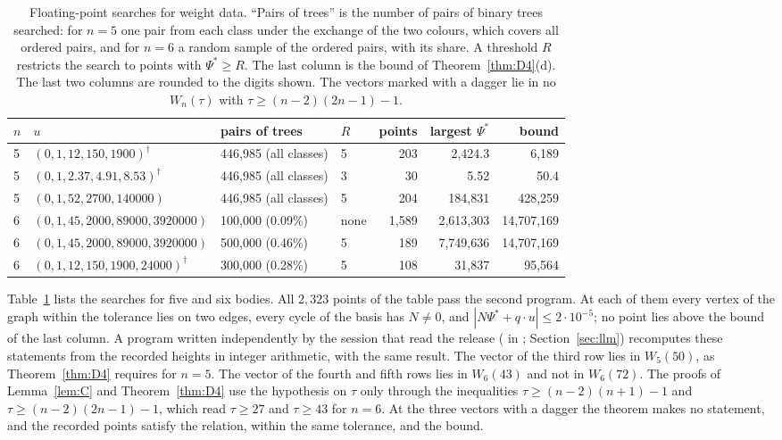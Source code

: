 \documentclass[11pt]{amsart}
\theoremstyle{definition}
\theoremstyle{remark}
\numberwithin{equation}{section}
\newcommand{\repo}[1]{\texttt{\detokenize{#1}}}
\newcommand{\Ps}{\Psi^{*}}
\begin{document}
\begin{table}[ht]
\caption{Floating-point searches for weight data. ``Pairs of trees'' is the number of pairs of binary
trees searched: for $n = 5$ one pair from each class under the exchange of the two colours, which
covers all ordered pairs, and for $n = 6$ a random sample of the ordered pairs, with its share. A
threshold $R$ restricts the search to points with $\Ps \ge R$. The last column is the bound of
Theorem~\ref{thm:D4}(d). The last two columns are rounded to the digits shown. The vectors marked
with a dagger lie in no $W_n(\tau)$ with $\tau \ge (n - 2)(2n - 1) - 1$.}\label{tab:comp}
\footnotesize
\setlength{\tabcolsep}{4pt}
\begin{tabular}{@{}l>{\raggedright}p{}>{\raggedright}p{}lrrr@{}}
\toprule
$n$ & $u$ & pairs of trees & $R$ & points & largest $\Ps$ & bound \\
\midrule
5 & $(0, 1, 12, 150, 1900)^{\dagger}$ & 446,985 (all classes) & 5 & 203 & 2,424.3 & 6,189 \\
5 & $(0, 1, 2.37, 4.91, 8.53)^{\dagger}$ & 446,985 (all classes) & 3 & 30 & 5.52 & 50.4 \\
5 & $(0, 1, 52, 2700, 140000)$ & 446,985 (all classes) & 5 & 204 & 184,831 & 428,259 \\
6 & $(0, 1, 45, 2000, 89000, 3920000)$ & 100,000 (0.09\%) & none & 1,589 & 2,613,303 & 14,707,169 \\
6 & $(0, 1, 45, 2000, 89000, 3920000)$ & 500,000 (0.46\%) & 5 & 189 & 7,749,636 & 14,707,169 \\
6 & $(0, 1, 12, 150, 1900, 24000)^{\dagger}$ & 300,000 (0.28\%) & 5 & 108 & 31,837 & 95,564 \\
\bottomrule
\end{tabular}
\end{table}

Table~\ref{tab:comp} lists the searches for five and six bodies. All $2{,}323$ points of the
table pass the second program. At each of them every vertex of the graph within the tolerance lies on
two edges, every cycle of the basis has $N \ne 0$, and $|N\Ps + q \cdot u| \le 2 \cdot 10^{-5}$; no
point lies above the bound of the last column. A program written independently by the session that read the release
(\repo{independent_points.py} in \repo{data/n7/allN/hier/r34}; Section~\ref{sec:llm}) recomputes
these statements from the recorded heights in integer arithmetic, with the same result. The vector of the third row lies in $W_5(50)$, as Theorem~\ref{thm:D4} requires for $n = 5$.
The vector of the fourth and fifth rows lies in $W_6(43)$ and not in $W_6(72)$. The proofs of
Lemma~\ref{lem:C} and Theorem~\ref{thm:D4} use the hypothesis on $\tau$ only through the inequalities
$\tau \ge (n - 2)(n + 1) - 1$ and $\tau \ge (n - 2)(2n - 1) - 1$, which read $\tau \ge 27$ and
$\tau \ge 43$ for $n = 6$. At the three vectors with a dagger the theorem makes no statement, and the
recorded points satisfy the relation, within the same tolerance, and the bound.
\end{document}
